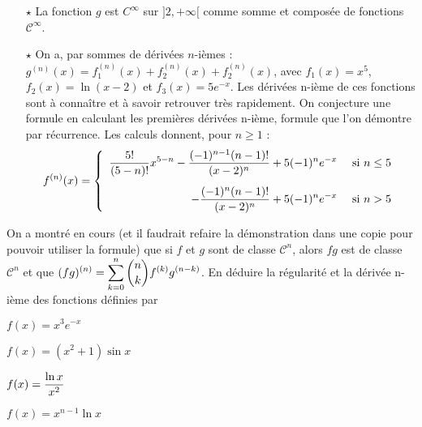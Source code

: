\documentclass[a4paper, 11pt,reqno]{article}
\begin{document}
\begin{correction}
\begin{enumerate}
		      \begin{itemize}
			      \item[$\star$] La fonction $g$ est $C^{\infty}$ sur $]2,+\infty[$ comme somme et compos\'ee de fonctions $\mathcal{C}^{\infty}$.
			      \item[$\star$] On a, par sommes de d\'eriv\'ees $n$-i\`emes : $g^{(n)}(x) = f_1^{(n)}(x) +f_2^{(n)}(x) +f_2^{(n)}(x)$, avec $f_1(x) = x^5$, $f_2(x)=\ln(x-2)$ et $f_3(x) = 5 e^{-x}$. Les d\'eriv\'ees n-i\`eme de ces fonctions sont \`a conna\^itre et \`a savoir retrouver tr\`es rapidement. On conjecture une formule en calculant les premi\`eres d\'eriv\'ees n-i\`eme, formule que l'on d\'emontre par r\'ecurrence. Les calculs donnent, pour $n \geq 1$ :
			            $$f^{(n)}(x) = \left\{ \begin{array}{rl}
					            \ddp \frac{5!}{(5-n)!} x^{5-n} - \frac{(-1)^{n-1}(n-1)!}{(x-2)^n} + 5 (-1)^n e^{-x} & \textmd{ si } n \leq 5\vsec \\
					            \ddp - \frac{(-1)^{n}(n-1)!}{(x-2)^n} + 5 (-1)^n e^{-x}                             & \textmd{ si } n > 5
				            \end{array}\right.$$
		      \end{itemize}
	\end{enumerate}
\end{correction}
% 
\begin{exercice}   \;
	On a montr\'e en cours (et il faudrait refaire la d\'emonstration dans une copie pour pouvoir utiliser la formule) que si $f$ et $g$ sont de classe $\mathcal{C}^n$, alors $fg$ est de classe $\mathcal{C}^n$ et que $\displaystyle (fg)^{(n)} = \sum_{k=0}^n \binom{n}{k} f^{(k)} g^{(n-k)}$. En d\'eduire la r\'egularit\'e et la d\'eriv\'ee n-i\`eme des fonctions d\'efinies par
	\begin{enumerate}
		\begin{minipage}[t]{0.45\textwidth}
			\item   $f(x)=x^3e^{-x}$
			\item   $f(x)=(x^2+1)\sin{x}$
		\end{minipage}
		\begin{minipage}[t]{0.45\textwidth}
			\item  $f(x)=\displaystyle\frac{\ln{x}}{x^2}$
			\item $f(x)=x^{n-1}\ln{x}$
		\end{minipage}
	\end{enumerate}
\end{exercice}
\end{document}
